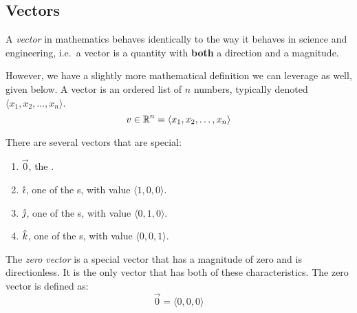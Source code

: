 \subsection{Vectors}\label{subsec:Vectors}
\begin{definition}[Vector]\label{def:Vector}
  A \emph{vector} in mathematics behaves identically to the way it behaves in science and engineering, i.e.\ a vector is a quantity with \textbf{both} a direction and a magnitude.

  However, we have a slightly more mathematical definition we can leverage as well, given below.
  A vector is an ordered list of $n$ numbers, typically denoted $\langle x_{1}, x_{2}, \ldots, x_{n} \rangle$.
  \begin{equation}\label{eq:Vector}
    v \in \operatorname{\mathbb{R}}^{n} = \langle x_{1}, x_{2}, \ldots, x_{n} \rangle
  \end{equation}
\end{definition}

There are several vectors that are special:
\begin{enumerate}[noitemsep]
\item $\vec{0}$, the .
\item $\hat{\imath}$, one of the s, with value $\langle 1, 0, 0 \rangle$.
\item $\hat{\jmath}$, one of the s, with value $\langle 0, 1, 0 \rangle$.
\item $\hat{k}$, one of the s, with value $\langle 0, 0, 1 \rangle$.
\end{enumerate}

\begin{definition}\label{def:Zero_Vector}
  The \emph{zero vector} is a special vector that has a magnitude of zero and is directionless.
  It is the only vector that has both of these characteristics.
  The zero vector is defined as:
  \begin{equation}\label{eq:Zero_Vector}
    \vec{0} = \langle 0, 0, 0 \rangle
  \end{equation}
\end{definition}


